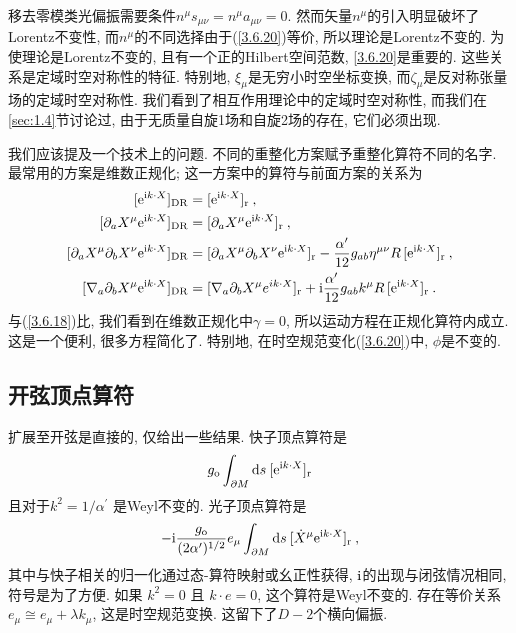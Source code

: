 移去零模类光偏振需要条件$n^{\mu} s_{\mu \nu}=n^{\mu} a_{\mu \nu}=0$. 然而矢量$n^\mu$的引入明显破坏了Lorentz不变性, 而$n^\mu$的不同选择由于(\ref{3.6.20})等价, 所以理论是Lorentz不变的. 为使理论是Lorentz不变的, 且有一个正的Hilbert空间范数, \eqref{3.6.20}是重要的. 这些关系是定域时空对称性的特征. 特别地, $\xi_{\mu}$是无穷小时空坐标变换, 而$\zeta_{\mu}$是反对称张量场的定域时空对称性. 我们看到了相互作用理论中的定域时空对称性, 而我们在\ref{sec:1.4}节讨论过, 由于无质量自旋1场和自旋2场的存在, 它们必须出现.

我们应该提及一个技术上的问题. 不同的重整化方案赋予重整化算符不同的名字. 最常用的方案是维数正规化; 这一方案中的算符与前面方案的关系为
\begin{subequations} \label{3.6.24}
\begin{align}
[\me^{\mi k \cdot X} ]_{\mathrm{DR}} &= [\me^{\mi k \cdot X}]_{\mathrm{r}} \:, \label{3.6.24a} \\
[\partial_{a} X^{\mu} \me^{\mi k \cdot X}]_{\mathrm{DR}}&=[\partial_{a} X^{\mu} \me^{\mi k \cdot X}]_{\mathrm{r}}  \:, \label{3.6.24b} \\
[\partial_{a} X^{\mu} \partial_{b} X^{\nu} \me^{\mi k \cdot X}]_{\mathrm{DR}}&=[\partial_{a} X^{\mu} \partial_{b} X^{\nu} \me^{\mi k \cdot X}]_{\mathrm{r}}-\frac{\alpha^{\prime}}{12} g_{a b} \eta^{\mu \nu} R\, [\me^{\mi k \cdot X}]_{\mathrm{r}} \:, \label{3.6.24c} \\
[\nabla_{a} \partial_{b} X^{\mu} \me^{\mi k \cdot X}]_{\mathrm{DR}}&=[\nabla_{a} \partial_{b} X^{\mu} e^{i k \cdot X}]_{\mathrm{r}}+ \mi \frac{\alpha^{\prime}}{12} g_{a b} k^{\mu} R\, [\me^{\mi k \cdot X}]_{\mathrm{r}}  \:. \label{3.6.24d}
\end{align}
\end{subequations}
与(\ref{3.6.18})比, 我们看到在维数正规化中$\gamma=0$, 所以运动方程在正规化算符内成立. 这是一个便利, 很多方程简化了. 特别地, 在时空规范变化(\ref{3.6.20})中, $\phi$是不变的.\\

\subsection*{开弦顶点算符}

扩展至开弦是直接的, 仅给出一些结果. 快子顶点算符是
\begin{equation}
g_{\mathrm{o}} \int_{\partial M} \mathrm{d} s\: [\mathrm{e}^{\mathrm{i} k \cdot X}]_{\mathrm{r}} \label{3.6.25}
\end{equation}
且对于$k^{2}=1 / \alpha^{\prime}$ 是Weyl不变的. 光子顶点算符是
\begin{equation}
-\mathrm{i} \frac{g_{\mathrm{o}}}{(2 \alpha^{\prime})^{1 / 2}} e_{\mu} \int_{\partial M} \mathrm{d} s\: [\dot{X}^{\mu} \mathrm{e}^{\mathrm{i} k \cdot X}]_{\mathrm{r}} \:, \label{3.6.26}
\end{equation}
其中与快子相关的归一化通过态-算符映射或幺正性获得, $\mathrm{i}$的出现与闭弦情况相同, 符号是为了方便. 如果 $k^{2}=0$ 且 $k \cdot e=0 $, 这个算符是Weyl不变的. 存在等价关系$e_{\mu} \cong e_{\mu}+\lambda k_{\mu}$, 这是时空规范变换. 这留下了$D-2$个横向偏振. 


